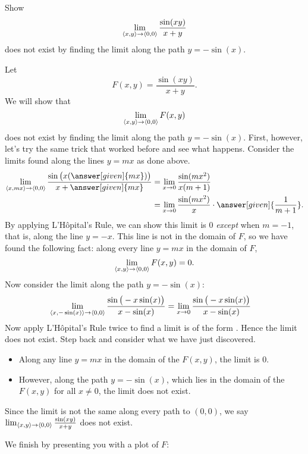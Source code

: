 \documentclass{ximera}
\begin{document}
\begin{example}
  Show
  \[
  \lim_{\left\langle x,y\right\rangle\to\left\langle 0,0\right\rangle} \frac{\sin(xy)}{x+y}
  \]
  does not exist by finding the limit along the path $y=-\sin(x)$.
  \begin{explanation}
    Let
    \[
    F(x,y) = \frac{\sin(xy)}{x+y}.
    \]
    We will show that
    \[
    \lim_{\left\langle x,y\right\rangle\to\left\langle 0,0\right\rangle} F(x,y)
    \]
    does not exist by finding the limit along the path
    $y=-\sin(x)$. First, however, let's try the same trick that worked
    before and see what happens. Consider the limits found along the
    lines $y=mx$ as done above.
    \begin{align*}
      \lim_{\vector{x,mx}\to\vector{0,0}} \frac{\sin\big(x(\answer[given]{mx})\big)}{x+\answer[given]{mx}} &= \lim_{x\to 0} \frac{\sin (mx^2)}{x(m+1)} \\
      &= \lim_{x\to 0} \frac{\sin(mx^2)}{x}\cdot\answer[given]{\frac{1}{m+1}}.
    \end{align*}
    By applying L'H\^opital's Rule, we can show this limit is $0$
    \emph{except} when $m=-1$, that is, along the line $y=-x$. This
    line is not in the domain of $F$, so we have found the following
    fact: along every line $y=mx$ in the domain of $F$,
    \[
    \lim_{\left\langle x,y\right\rangle\to\left\langle 0,0\right\rangle} F(x,y)=0.
    \]
    Now consider the limit along the path $y=-\sin(x)$:
    \begin{align*}
      \lim_{\left\langle x,-\sin(x)\right\rangle\to\left\langle 0,0\right\rangle} \frac{\sin\big(-x\sin(x)\big)}{x-\sin(x)} &= \lim_{x\to0} \frac{\sin\big(-x\sin(x)\big)}{x-\sin(x)}
    \end{align*}
    Now apply L'H\^opital's Rule twice to find a limit is of the form
    \numOverZero.  Hence the limit does not exist.  Step back and
    consider what we have just discovered.
    \begin{itemize}
    \item Along any line $y=mx$ in the domain of the $F(x,y)$, the
      limit is $0$.
    \item However, along the path $y=-\sin(x)$, which lies in the
      domain of the $F(x,y)$ for all $x\neq 0$, the limit does not
      exist.
    \end{itemize}
    Since the limit is not the same along every path to $(0,0)$, we say
    $\lim_{\left\langle x,y\right\rangle\to\left\langle 0,0\right\rangle}\frac{\sin(xy)}{x+y}$ does not exist.
    \begin{onlineOnly}
      We finish by presenting you with a plot of $F$:
      \begin{center}
      \end{center}
    \end{onlineOnly}
  \end{explanation}
\end{example}
\end{document}
